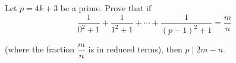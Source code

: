 Let $p=4k+3$ be a prime. Prove that if\[\dfrac {1} {0^2+1}+\dfrac{1}{1^2+1}+\cdots+\dfrac{1}{(p-1)^2+1}=\dfrac{m} {n}\]

(where the fraction $\dfrac {m} {n}$ is in reduced terms), then $p \mid 2m-n$.
